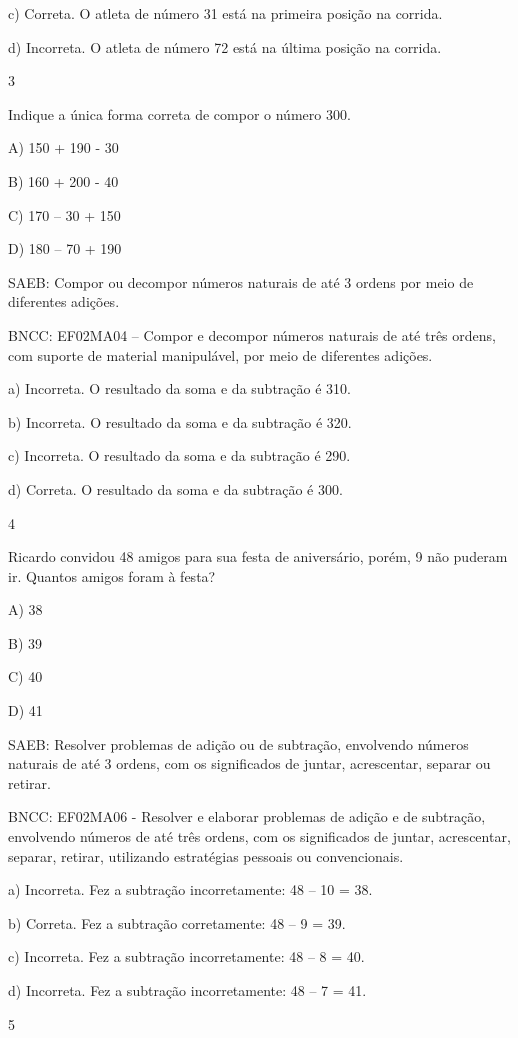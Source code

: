 \begin{escolha}
\begin{escolha}
{{{{c) Correta. O atleta de número 31 está na primeira posição na
corrida.

d) Incorreta. O atleta de número 72 está na última posição na corrida.

\num{3}

Indique a única forma correta de compor o número 300.

A) 150 + 190 - 30

B) 160 + 200 - 40

C) 170 -- 30 + 150

D) 180 -- 70 + 190

SAEB: Compor ou decompor números naturais de até 3 ordens por
meio de diferentes adições.

BNCC: EF02MA04 -- Compor e decompor números naturais de até três ordens,
com suporte de material manipulável, por meio de diferentes adições.

a) Incorreta. O resultado da soma e da subtração é 310.

b) Incorreta. O resultado da soma e da subtração é 320.

c) Incorreta. O resultado da soma e da subtração é 290.

d) Correta. O resultado da soma e da subtração é 300.

\num{4}

Ricardo convidou 48 amigos para sua festa de aniversário, porém, 9 não
puderam ir. Quantos amigos foram à festa?

A) 38

B) 39

C) 40

D) 41

SAEB: Resolver problemas de adição ou de subtração, envolvendo
números naturais de até 3 ordens, com os significados de juntar,
acrescentar, separar ou retirar.

BNCC: EF02MA06 - Resolver e elaborar problemas de adição e de subtração,
envolvendo números de até três ordens, com os significados de juntar,
acrescentar, separar, retirar, utilizando estratégias pessoais ou
convencionais.

a) Incorreta. Fez a subtração incorretamente: 48 -- 10 = 38.

b) Correta. Fez a subtração corretamente: 48 -- 9 = 39.

c) Incorreta. Fez a subtração incorretamente: 48 -- 8 = 40.

d) Incorreta. Fez a subtração incorretamente: 48 -- 7 = 41.

\num{5}

}}}}
\end{escolha}
\end{escolha}
